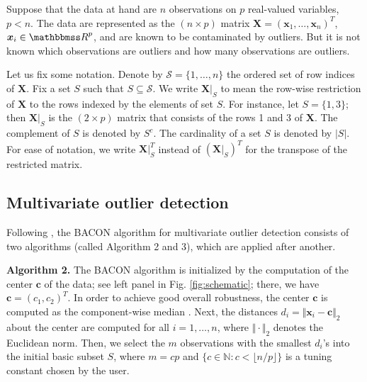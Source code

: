 \documentclass[a4paper,oneside,11pt,DIV=12]{scrartcl}
\newcommand{\R}{{\mathbbmss R}}
\begin{document}
Suppose that the data at hand are $n$ observations on $p$ real-valued
variables, $p < n$. The data are represented as the $(n \times p)$
matrix $\bm X = (\bm x_1, \ldots, \bm x_n)^T$, $\bm x_i \in \R^p$,
and are known to be contaminated by outliers. But it is not known which
observations are outliers and how many observations are outliers.

Let us fix some notation. Denote by $\mathscr{S}=\{1, \ldots, n\}$ the
ordered set of row indices of $\bm X$. Fix a set $S$ such that
$S \subseteq \mathscr{S}$. We write $\bm X \vert_{S}$ to mean the
row-wise restriction of $\bm X$ to the rows indexed by the elements
of set $S$. For instance, let $S=\{1,3\}$; then $\bm X \vert_{S}$ is
the $(2 \times p)$ matrix that consists of the rows 1 and 3 of $\bm X$.
The complement of $S$ is denoted by $S^c$. The cardinality of a set $S$
is denoted by $\vert S \vert$. For ease of notation, we write
$\bm X \vert_S^T$ instead of $(\bm X \vert_S)^T$ for the transpose of
the restricted matrix.

\subsection{Multivariate outlier detection}

Following \citet{billor_hadi_etal_2000}, the BACON algorithm for multivariate
outlier detection consists of two algorithms (called Algorithm 2 and 3),
which are applied after another.

\vspace{1em}
\noindent \textbf{\sffamily Algorithm 2.} The BACON algorithm is initialized
by the computation of the center $\bm c$ of the data; see left panel in
Fig. \ref{fig:schematic}; there, we have $\bm c = (c_1, c_2)^T$. In order
to achieve good overall robustness, the center $\bm c$ is computed as
the component-wise median
\citep[][see ``Version 2'' of Algorihm 2]{billor_hadi_etal_2000}. Next,
the distances $d_i = \Vert \bm x_i - \bm c \Vert_2$ about the center
are computed for all $i = 1,\ldots,n$, where $\Vert \cdot \Vert_2$
denotes the Euclidean norm. Then, we select the $m$ observations with
the smallest $d_i$'s into the initial basic subset $S$, where $m = cp$
and $\{c \in \mathbb{N} : c < \lfloor n / p \rfloor\}$ is a tuning
constant chosen by the user.
\end{document}
